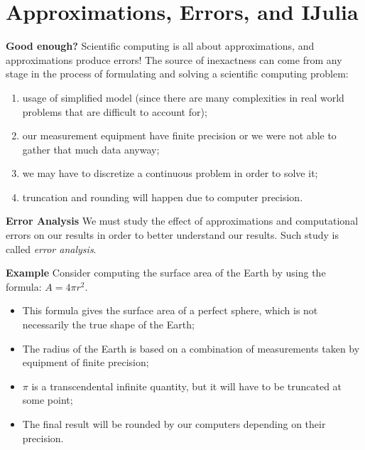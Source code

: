 \documentclass[xcolor=dvipsnames]{beamer}
\begin{document}
\section{Approximations, Errors, and IJulia}
\begin{frame}[fragile]
{\bf Good enough?}
Scientific computing is all about approximations, and approximations produce errors! 
\vfill
\pause
The source of inexactness can come from any stage in the process of formulating and solving a scientific computing problem: \pause
\begin{enumerate}
\item usage of simplified model (since there are many complexities in real world problems that are difficult to account for); \pause
\item our measurement equipment have finite precision or we were not able to gather that much data anyway; \pause
\item we may have to discretize a continuous problem in order to solve it; \pause
\item truncation and rounding will happen due to computer precision.
\end{enumerate}
\end{frame}

\begin{frame}
{\bf Error Analysis}
We must study the effect of approximations and computational errors on our results in order to better understand our results. Such study is called \emph{error analysis}.\\
\end{frame}

\begin{frame}
{\bf Example } 
Consider computing the surface area of the Earth by using the formula: $A = 4\pi r^2$.\\
\begin{itemize}
\item This formula gives the surface area of a perfect sphere, which is not necessarily the true shape of the Earth; \pause
\item The radius of the Earth is based on a combination of measurements taken by equipment of finite precision; \pause
\item $\pi$ is a transcendental infinite quantity, but it will have to be truncated at some point; \pause
\item The final result will be rounded by our computers depending on their precision.\\
\end{itemize}
\end{frame}
\end{document}
